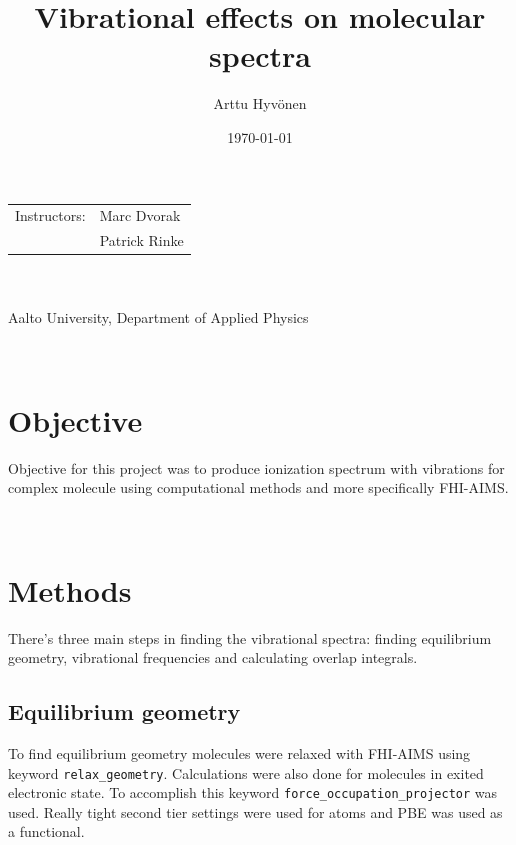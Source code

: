 \documentclass{article}
\title{Vibrational effects on molecular spectra} %
\author{Arttu Hyv\"onen} %
\date{\today} %
\begin{document}
\maketitle %

\begin{center}
\begin{tabular}{l l}
 \\ 
Instructors:    & Marc Dvorak \\
                & Patrick Rinke 
\end{tabular}
~\\~\\
Aalto University, Department of Applied Physics
\end{center}


~\\
\section{Objective}

Objective for this project was to produce ionization spectrum with vibrations for complex molecule using computational methods and more specifically FHI-AIMS.


~\\
\section{Methods}

There's three main steps in finding the vibrational spectra: finding equilibrium geometry, vibrational frequencies and calculating overlap integrals.

\subsection{Equilibrium geometry}

To find equilibrium geometry molecules were relaxed with FHI-AIMS using keyword \lstinline{relax_geometry}. Calculations were also done for molecules in exited electronic state. To accomplish this keyword \lstinline{force_occupation_projector} was used. Really tight second tier settings were used for atoms and PBE was used as a functional.
\end{document}
